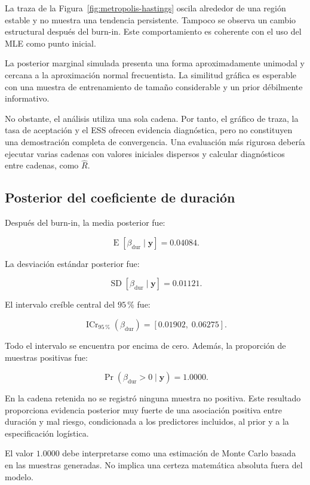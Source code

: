 La traza de la Figura~\ref{fig:metropolis-hastings} oscila alrededor de
una región estable y no muestra una tendencia persistente. Tampoco se
observa un cambio estructural después del burn-in. Este comportamiento es
coherente con el uso del MLE como punto inicial.

La posterior marginal simulada presenta una forma aproximadamente
unimodal y cercana a la aproximación normal frecuentista. La similitud
gráfica es esperable con una muestra de entrenamiento de tamaño
considerable y un prior débilmente informativo.

No obstante, el análisis utiliza una sola cadena. Por tanto, el gráfico
de traza, la tasa de aceptación y el ESS ofrecen evidencia diagnóstica,
pero no constituyen una demostración completa de convergencia. Una
evaluación más rigurosa debería ejecutar varias cadenas con valores
iniciales dispersos y calcular diagnósticos entre cadenas, como
\(\widehat{R}\).

\subsection{Posterior del coeficiente de duración}

Después del burn-in, la media posterior fue:

\[
\operatorname{E}
\left[
    \beta_{\mathrm{dur}}
    \mid
    \mathbf{y}
\right]
=
0.04084.
\]

La desviación estándar posterior fue:

\[
\operatorname{SD}
\left[
    \beta_{\mathrm{dur}}
    \mid
    \mathbf{y}
\right]
=
0.01121.
\]

El intervalo creíble central del \(95\,\%\) fue:

\[
\operatorname{ICr}_{95\,\%}
\left(
    \beta_{\mathrm{dur}}
\right)
=
[0.01902,\;0.06275].
\]

Todo el intervalo se encuentra por encima de cero. Además, la proporción
de muestras positivas fue:

\[
\Pr
\left(
    \beta_{\mathrm{dur}}>0
    \mid
    \mathbf{y}
\right)
=
1.0000.
\]

En la cadena retenida no se registró ninguna muestra no positiva. Este
resultado proporciona evidencia posterior muy fuerte de una asociación
positiva entre duración y mal riesgo, condicionada a los predictores
incluidos, al prior y a la especificación logística.

El valor \(1.0000\) debe interpretarse como una estimación de Monte Carlo
basada en las muestras generadas. No implica una certeza matemática
absoluta fuera del modelo.

